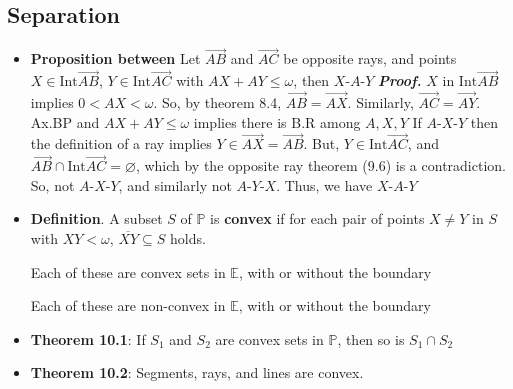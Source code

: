 \documentclass{report}
\begin{document}
    \subsection{Separation}
    \begin{itemize}
        \item \textbf{Proposition between} Let $\overrightarrow{AB}$ and $\overrightarrow{AC}$ be opposite rays, and points $X \in \text{Int}\overrightarrow{AB}$, $Y \in \text{Int}\overrightarrow{AC} $ with $AX + AY \leq \omega$, then $ X\text{-}A\text{-}Y$
            \bigbreak \noindent 
            \textbf{\textit{Proof.}} $X$ in $\text{Int}\overrightarrow{AB}$ implies $0 < AX < \omega$. So, by theorem 8.4, $\overrightarrow{AB} = \overrightarrow{AX}$. Similarly, $\overrightarrow{AC} = \overrightarrow{AY}$. 
            \bigbreak \noindent 
            Ax.BP and $AX + AY \leq \omega$ implies there is B.R among $A,X,Y$
            \bigbreak \noindent 
            If $ A\text{-}X\text{-}Y$ then the definition of a ray implies $ Y \in \overrightarrow{AX} = \overrightarrow{AB}$. But, $Y \in \text{Int}\overrightarrow{AC}$, and $\overrightarrow{AB} \cap \text{Int}\overrightarrow{AC}  = \varnothing$, which by the opposite ray theorem (9.6) is a contradiction. So, not $ A\text{-}X\text{-}Y$, and similarly not $ A\text{-}Y\text{-}X $. Thus, we have $ X\text{-}A\text{-}Y $
        \item \textbf{Definition}. A subset $S$ of $\mathbb{P}$ is \textbf{convex} if for each pair of points $X \ne Y$ in $S$ with $XY < \omega$, $\overline{XY} \subseteq S$ holds.
            \bigbreak \noindent 
            \begin{figure}[ht]
                \centering
                \label{fig:conex1}
            \end{figure}
            \bigbreak \noindent 
            Each of these are convex sets in $\mathbb{E}$, with or without the boundary
            \bigbreak \noindent 
            \begin{figure}[ht]
                \centering
                \label{fig:nonconvex2}
            \end{figure}
            \bigbreak \noindent 
            Each of these are non-convex in $\mathbb{E}$, with or without the boundary
        \item \textbf{Theorem 10.1}: If $S_{1}$ and $S_{2}$ are convex sets in $\mathbb{P}$, then so is $S_{1} \cap S_{2}$
        \item \textbf{Theorem 10.2}: Segments, rays, and lines are convex.

\end{itemize}
\end{document}
